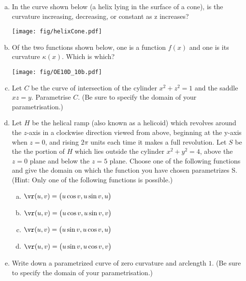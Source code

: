\goodbreak
\begin{question}[M317 2010D] %

\begin{enumerate}[(a)]
\item
In the curve shown below (a helix lying in the surface of a cone), is the
curvature increasing, decreasing, or constant as z increases?

\begin{center}
       \texttt{[image: fig/helixCone.pdf]}
\end{center}


\item
Of the two functions shown below, one is a function $f(x)$ and one is its
curvature $\kappa(x)$. Which is which?

\begin{center}
       \texttt{[image: fig/OE10D\_10b.pdf]}
\end{center}



\item
Let $C$ be the curve of intersection of the cylinder $x^2 + z^2 = 1$ 
and the saddle $xz = y$. Parametrise $C$. (Be sure to specify the domain of
your parametrisation.)

\item 
Let $H$ be the helical ramp (also known as a helicoid) which revolves around
the $z$-axis in a clockwise direction viewed from above, beginning 
at the y-axis when $z = 0$, and rising $2\pi$ units each time it makes 
a full revolution. Let $S$ be the the portion
of $H$ which lies outside the cylinder $x^2 + y^2 = 4$, above the 
$z = 0$ plane and below the $z = 5$ plane.
Choose one of the following functions and give the domain on which the 
function you have chosen parametrizes S. (Hint: Only one of the following functions is possible.)
\begin{enumerate}[(a)]
\item 
$\vr(u, v) = \big(u \cos v, u \sin v, u\big)$
\item 
$\vr(u, v) = \big(u \cos v, u \sin v, v\big)$
\item 
$\vr(u, v) = \big(u \sin v, u \cos v, u\big)$
\item 
$\vr(u, v) = \big(u \sin v, u \cos v, v\big)$
\end{enumerate}

\item 
Write down a parametrized curve of zero curvature and arclength $1$.
(Be sure to specify the domain of your parametrisation.)


\end{enumerate}
\end{question}
